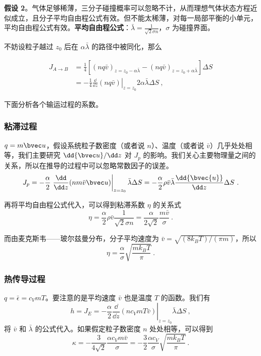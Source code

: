 \textbf{假设 2}。气体足够稀薄，三分子碰撞概率可以忽略不计，从而理想气体状态方程近似成立，且分子平均自由程公式有效。但不能太稀薄，对每一局部平衡的小单元，平均自由程公式有效。\textbf{平均自由程公式}：$\bar \lambda = \frac{1}{\sqrt{2} \sigma n}$，$\sigma$ 为碰撞界面。

不妨设粒子越过 $z_0$ 后在 $\alpha \bar \lambda$ 的路径中被同化，那么

\begin{align}
J_{A\rightarrow B} &=\frac{1}{4}[(nq\bar v)_{z=z_0-\alpha \bar \lambda}-(nq\bar v)_{z=z_0+\alpha \bar \lambda}]\Delta S\\
&=-\frac{1}{4}\left.\frac{\dd}{\dd z}(nq\bar v)\right|_{z=z_0} 2\alpha\bar \lambda \Delta S~,
\end{align}

下面分析各个输运过程的系数。

\subsubsection{粘滞过程}
$q=m\bvec u$，假设系统粒子数密度（或者说 $n$）、温度（或者说 $\bar v$）几乎处处相等，我们主要研究 $\dd{\bvec u}/\dd z$ 对 $J_p$ 的影响。我们关心主要物理量之间的关系，所以在推导的过程中可以忽略常数因子的误差。
\begin{equation}
J_p=-\frac{\alpha}{2}\left.\frac{\dd}{\dd z}(nm\bar v \bvec u)\right|_{z=z_0}\bar \lambda \Delta S
=-\frac{\alpha}{2}\rho\bar v \bar \lambda \frac{\dd{\bvec{u}}}{\dd z}\Delta S~.
\end{equation}

再将平均自由程公式代入，可以得到粘滞系数 $\eta$ 的关系式
\begin{equation}
\eta = \frac{\alpha}{2}\rho\bar v \frac{1}{\sqrt{2}\sigma n}=\frac{\alpha}{2\sqrt{2}}\frac{m \bar v}{\sigma}~.
\end{equation}

而由麦克斯韦——玻尔兹曼分布，分子平均速度为 $\bar v=\sqrt{(8k_BT)/(\pi m)}$，所以
\begin{equation}
\eta = \frac{\alpha}{\sigma}\sqrt{\frac{mk_BT}{\pi}}~.
\end{equation}

\subsubsection{热传导过程}
$q=\bar \epsilon = c_VmT$。要注意的是平均速度 $\bar v$ 也是温度 $T$ 的函数。我们有
\begin{equation}
h=J_E=-\frac{\alpha}{2}\left.\frac{\dd }{\dd z}(nc_VmT\bar v)\right|_{z=z_0} \bar\lambda \Delta S~,
\end{equation}
将 $\bar v$ 和 $\bar\lambda$ 的公式代入。如果假定粒子数密度 $n$ 处处相等，可以得到
\begin{equation}
\kappa=-\frac{3}{4\sqrt{2}}\frac{\alpha c_Vm\bar v}{\sigma}=-\frac{3}{2}\frac{\alpha c_V}{\sigma}\sqrt{\frac{mk_BT}{\pi}}~.
\end{equation}

